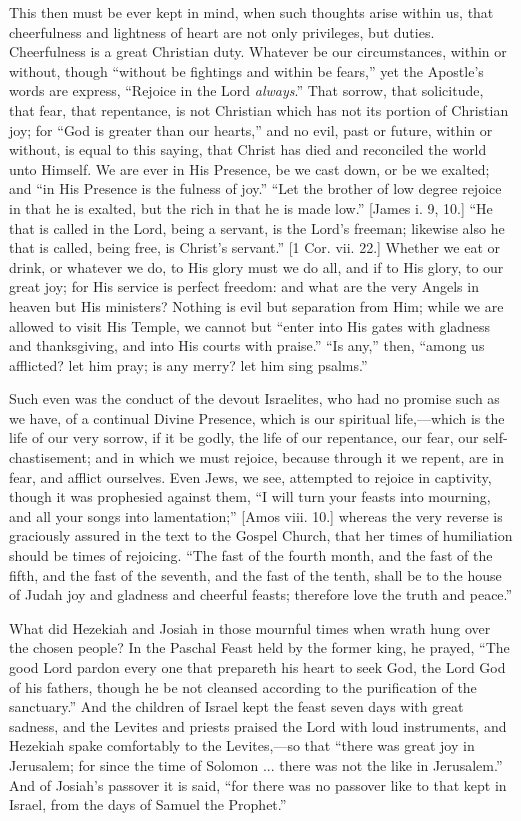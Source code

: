 This then must be ever kept in mind, when such thoughts arise
within us, that cheerfulness and lightness of heart are not only
privileges, but duties. Cheerfulness is a great Christian duty.
Whatever be our circumstances, within or without, though ``without
be fightings and within be fears,'' yet the Apostle's words are
express, ``Rejoice in the Lord \emph{always}.'' That sorrow,
that solicitude, that fear, that repentance, is not Christian which
has not its portion of Christian joy; for ``God is greater than
our hearts,'' and no evil, past or future, within or without, is
equal to this saying, that Christ has died and reconciled the world
unto Himself. We are ever in His Presence, be we cast down, or be we
exalted; and ``in His Presence is the fulness of joy.''
``Let the brother of low degree rejoice in that he is exalted, but
the rich in that he is made low.'' [James i. 9, 10.] ``He that
is called in the Lord, being a servant, is the Lord's freeman;
likewise also he that is called, being free, is Christ's
servant.'' [1 Cor. vii. 22.] Whether we eat or drink, or whatever
we do, to His glory must we do all, and if to His glory, to our great
joy; for His service is perfect freedom: and what are the very Angels
in heaven but His ministers? Nothing is evil but separation from Him;
while we are allowed to visit His Temple, we cannot but ``enter
into His gates with gladness and thanksgiving, and into His courts
with praise.'' ``Is any,'' then, ``among us afflicted?
let him pray; is any merry? let him sing psalms.''

Such even was the conduct of the devout Israelites, who had no
promise such as we have, of a continual Divine Presence, which is our
spiritual life,—which is the life of our very sorrow, if it be
godly, the life of our repentance, our fear, our self-chastisement;
and in which we must rejoice, because through it we repent, are in
fear, and afflict ourselves. Even Jews, we see, attempted to rejoice
in captivity, though it was prophesied against them, ``I will turn
your feasts into mourning, and all your songs into lamentation;''
[Amos viii. 10.] whereas the very reverse is graciously assured in the
text to the Gospel Church, that her times of humiliation should be
times of rejoicing. ``The fast of the fourth month, and the fast
of the fifth, and the fast of the seventh, and the fast of the tenth,
shall be to the house of Judah joy and gladness and cheerful feasts;
therefore love the truth and peace.''

What did Hezekiah and Josiah in those mournful times when wrath
hung over the chosen people? In the Paschal Feast held by the former
king, he prayed, ``The good Lord pardon every one that prepareth
his heart to seek God, the Lord God of his fathers, though he be not
cleansed according to the purification of the sanctuary.'' And the
children of Israel kept the feast seven days with great sadness, and
the Levites and priests praised the Lord with loud instruments, and
Hezekiah spake comfortably to the Levites,—so that ``there was
great joy in Jerusalem; for since the time of Solomon ... there was
not the like in Jerusalem.'' And of Josiah's passover it is said,
``for there was no passover like to that kept in Israel, from the
days of Samuel the Prophet.''

